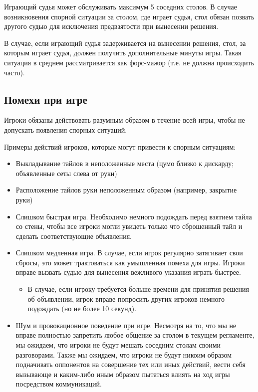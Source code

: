 Играющий судья может обслуживать максимум 5 соседних столов. В случае возникновения спорной ситуации за столом, где играет судья, стол обязан позвать другого судью для исключения предвзятости при вынесении решения.

В случае, если играющий судья задерживается на вынесении решения, стол, за которым играет судья, должен получить дополнительные минуты игры. Такая ситуация в среднем рассматривается как форс-мажор (т.е. не должна происходить часто).

\subsection{Помехи при игре}

Игроки обязаны действовать разумным образом в течение всей игры, чтобы не допускать появления спорных ситуаций.

Примеры действий игроков, которые могут привести к спорным ситуациям:
\begin{itemize}
	\item Выкладывание тайлов в неположенные места (цумо близко к дискарду; объявленные сеты слева от руки)
	\item Расположение тайлов руки неположенным образом (например, закрытие руки)
	\item Слишком быстрая игра. Необходимо немного подождать перед взятием тайла со стены, чтобы все игроки могли увидеть только что сброшенный тайл и сделать соответствующие объявления.
	\item Слишком медленная игра. В случае, если игрок регулярно затягивает свои сбросы, это может трактоваться как умышленная помеха для игры. Игроки вправе вызвать судью для вынесения вежливого указания играть быстрее.
	\begin{itemize}
		\item В случае, если игроку требуется больше времени для принятия решения об объявлении, игрок вправе попросить других игроков немного подождать (но не более 10 секунд).
	\end{itemize}
	\item Шум и провокационное поведение при игре. Несмотря на то, что мы не вправе полностью запретить любое общение за столом в текущем регламенте, мы ожидаем, что игроки не будут мешать соседним столам своими разговорами. Также мы ожидаем, что игроки не будут никоим образом подначивать оппонентов на совершение тех или иных действий, вести себя вызывающе и каким-либо иным образом пытаться влиять на ход игры посредством коммуникаций.
\end{itemize}

